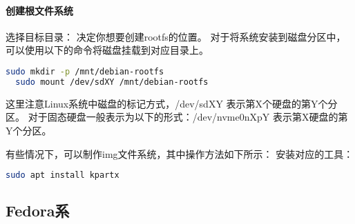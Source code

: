 \documentclass[lang=cn,a4paper,newtx]{elegantpaper}
\begin{document}
\paragraph{创建根文件系统}
选择目标目录：
决定你想要创建rootfs的位置。
对于将系统安装到磁盘分区中，可以使用以下的命令将磁盘挂载到对应目录上。
\begin{lstlisting}[language=bash]
  sudo mkdir -p /mnt/debian-rootfs
  sudo mount /dev/sdXY /mnt/debian-rootfs
\end{lstlisting}
这里注意Linux系统中磁盘的标记方式，/dev/sdXY 表示第X个硬盘的第Y个分区。
对于固态硬盘一般表示为以下的形式：/dev/nvme0nXpY 表示第X硬盘的第Y个分区。

有些情况下，可以制作img文件系统，其中操作方法如下所示：
安装对应的工具：
\begin{lstlisting}[language=bash]
  sudo apt install kpartx
\end{lstlisting}

\subsection{Fedora系}
\nocite{*}

\end{document}
